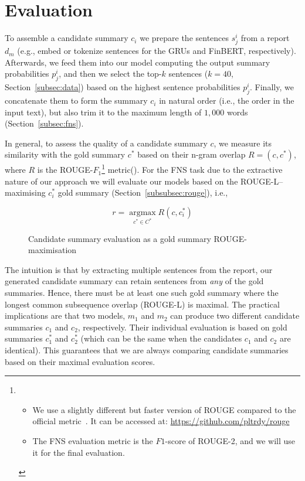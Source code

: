 \section{Evaluation}\label{sec:evaluation}

To assemble a candidate summary $c_{i}$ we prepare the sentences $s_{j}^{i}$ from a report $d_{m}$ (e.g., embed or tokenize sentences for the GRUs and FinBERT, respectively).
Afterwards, we feed them into our model computing the output summary probabilities $p_{j}^{i}$, and then we select the
top-$k$ sentences ($k=40$, Section~\ref{subsec:data}) based on the highest sentence probabilities $p_{j}^{i}$.
Finally, we concatenate them to form the summary $c_{i}$ in natural order (i.e., the order in the input text),
but also trim it to the maximum length of $1,000$ words (Section~\ref{subsec:fns}).

In general, to assess the quality of a candidate summary $c$, we measure its similarity with the gold summary $c^{*}$
based on their n-gram overlap $R=(c, c^{*})$, where $R$ is the ROUGE-$F_{1}$\footnote{
    \begin{itemize}
        \item We use a slightly different but faster version of ROUGE compared to the official metric~\cite{lin2004rouge}.
              It can be accessed at: \url{https://github.com/pltrdy/rouge}
        \item The FNS evaluation metric is the $F1$-score of ROUGE-2, and we will use it for the final evaluation.
    \end{itemize}
} metric(\cite{lin2004rouge}).
For the FNS task due to the extractive nature of our approach we will evaluate our models based on
the ROUGE-L--maximising $c^{*}_{i}$ gold summary (Section~\ref{subsubsec:rouge}), i.e.,

\begin{figure}[h]
    \centering
    \begin{equation}\label{eq:rouge_max}
        r = \underset{c^{*} \in C^{*}}{\operatorname{argmax}} R(c, c^{*}_{i})
    \end{equation}
    \caption{Candidate summary evaluation as a gold summary ROUGE-maximisation}
    \label{fig:rouge_max}
\end{figure}

The intuition is that by extracting multiple sentences from the report, our generated candidate summary can
retain sentences from \emph{any} of the gold summaries.
Hence, there must be at least one such gold summary where the longest common subsequence overlap (ROUGE-L) is maximal.
The practical implications are that two models, $m_{1}$ and $m_{2}$ can produce two different candidate summaries
$c_{1}$ and $c_{2}$, respectively.
Their individual evaluation is based on gold summaries $c^{*}_{1}$ and $c^{*}_{2}$ (which can be the same when the
candidates $c_{1}$ and $c_{2}$ are identical).
This guarantees that we are always comparing candidate summaries based on their maximal evaluation scores.


